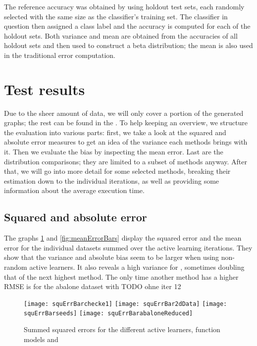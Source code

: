 The reference accuracy was obtained by using holdout test sets, each randomly selected with the same size as the classifier's training set. The classifier in question then assigned a class label and the accuracy is computed for each of the holdout sets. Both variance and mean are obtained from the accuracies of all holdout sets and then used to construct a beta distribution; the mean is also used in the traditional error computation.

\section{Test results}

Due to the sheer amount of data, we will only cover a portion of the generated graphs; the rest can be found in the . To help keeping an overview, we structure the evaluation into various parts: first, we take a look at the squared and absolute error measures to get an idea of the variance each methods brings with it. Then we evaluate the bias by inspecting the mean error. Last are the distribution comparisons; they are limited to a subset of methods anyway. After that, we will go into more detail for some selected methods, breaking their estimation down to the individual iterations, as well as providing some information about the average execution time.

\subsection{Squared and absolute error}

The graphs \ref{fig:squaredErrorBars} and \ref{fig:meanErrorBars} display the squared error and the mean error for the individual datasets summed over the active learning iterations. They show that the variance and absolute bias seem to be larger when using non-random active learners. It also reveals a high variance for , sometimes doubling that of the next highest method. The only time another method has a higher RMSE is for the abalone dataset with TODO ohne iter 12

\begin{figure}[h]
	\centering
	\texttt{[image: squErrBarchecke1]}
	\texttt{[image: squErrBar2dData]}
	\texttt{[image: squErrBarseeds]}
	\texttt{[image: squErrBarabaloneReduced]}
	\caption{Summed squared errors for the different active learners, function models and }
	\label{fig:squaredErrorBars}
\end{figure}

